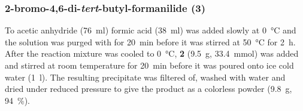 \subsubsection*{2-bromo-4,6-di-\textit{tert}-butyl-formanilide \textbf{(3)}}
To acetic anhydride (\qty{76}{\ml}) formic acid (\qty{38}{\ml}) was added slowly at \qty{0}{\degreeCelsius} and the solution was purged with  for \qty{20}{\minute} before it was stirred at \qty{50}{\degreeCelsius} for \qty{2}{\hour}. After the reaction mixture was cooled to \qty{0}{\degreeCelsius}, \textbf{2} (\qty{9.5}{\g}, \qty{33.4}{\mmol}) was added and stirred at room temperature for \qty{20}{\minute} before it was poured onto ice cold water (\qty{1}{\l}). The resulting precipitate was filtered of, washed with water and dried under reduced pressure to give the product as a colorless powder (\qty{9.8}{\g}, \qty{94}{\percent}).

